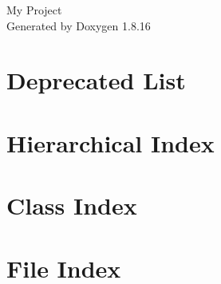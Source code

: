 \let\mypdfximage\pdfximage\def\pdfximage{\immediate\mypdfximage}\documentclass[twoside]{book}
\newcommand{\+}{\discretionary{\mbox{\scriptsize$\hookleftarrow$}}{}{}}
\newcommand{\clearemptydoublepage}{%
  \newpage{\pagestyle{empty}\cleardoublepage}%
}
\begin{document}
\hypersetup{pageanchor=false,
             bookmarksnumbered=true,
             pdfencoding=unicode
            }
\begin{titlepage}
\vspace*{7cm}
\begin{center}%
{\Large My Project }\\
\vspace*{1cm}
{\large Generated by Doxygen 1.8.16}\\
\end{center}
\end{titlepage}
\clearemptydoublepage
{}
\tableofcontents
\clearemptydoublepage
{}
\hypersetup{pageanchor=true}

\chapter{Deprecated List}
\label{deprecated}

\chapter{Hierarchical Index}

\chapter{Class Index}

\chapter{File Index}

\end{document}
